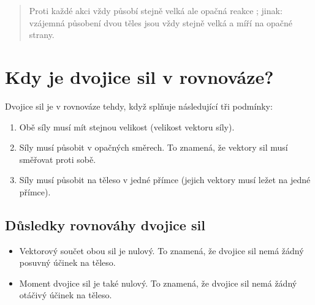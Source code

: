 \documentclass[letterpaper,10pt,english]{jupyterBook}
\begin{document}
\begin{enumerate}
\begin{quote}
\sphinxAtStartPar
{}
\end{quote}
\begin{quote}

\sphinxAtStartPar
Proti každé akci vždy působí stejně velká ale opačná reakce ; jinak: vzájemná působení dvou těles jsou vždy stejně velká a míří na opačné strany.
\end{quote}

\end{enumerate}

\sphinxAtStartPar
{}


\section{Kdy je dvojice sil v rovnováze?}
\label{\detokenize{Prednasky/1_3_Dynamika_pohybu_v_1D:kdy-je-dvojice-sil-v-rovnovaze}}
\sphinxAtStartPar
Dvojice sil je v rovnováze tehdy, když splňuje následující tři podmínky:
\begin{enumerate}
%
\item {} 
\sphinxAtStartPar
{} Obě síly musí mít stejnou velikost (velikost vektoru síly).

\item {} 
\sphinxAtStartPar
{} Síly musí působit v opačných směrech. To znamená, že vektory sil musí směřovat proti sobě.

\item {} 
\sphinxAtStartPar
{} Síly musí působit na těleso v jedné přímce (jejich vektory musí ležet na jedné přímce).

\end{enumerate}


\subsection{Důsledky rovnováhy dvojice sil}
\label{\detokenize{Prednasky/1_3_Dynamika_pohybu_v_1D:dusledky-rovnovahy-dvojice-sil}}\begin{itemize}
\item {} 
\sphinxAtStartPar
{} Vektorový součet obou sil je nulový. To znamená, že dvojice sil nemá žádný posuvný účinek na těleso.

\item {} 
\sphinxAtStartPar
{} Moment dvojice sil je také nulový. To znamená, že dvojice sil nemá žádný otáčivý účinek na těleso.

\end{itemize}
\end{document}
